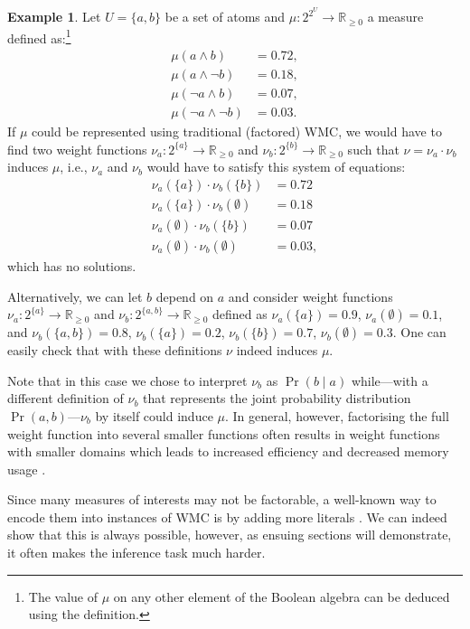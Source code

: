 \documentclass[letterpaper]{article} %
\theoremstyle{definition}
\newtheorem{example}{Example}
\theoremstyle{remark}
\begin{document}
{\begin{example}
  Let $U = \{a, b\}$ be a set of atoms and $\mu\colon 2^{2^U} \to
  \mathbb{R}_{\ge 0}$ a measure defined as:\footnote{The value of $\mu$ on any
    other element of the Boolean algebra can be deduced using the definition.}
  \begin{align*}
    \mu(a \land b) &= 0.72, \\
    \mu(a \land \neg b) &= 0.18, \\
    \mu(\neg a \land b) &= 0.07, \\
    \mu(\neg a \land \neg b) &= 0.03.
  \end{align*}
  If $\mu$ could be represented using traditional (factored) WMC, we would have
  to find two weight functions $\nu_a\colon 2^{\{a\}} \to \mathbb{R}_{\ge 0}$
  and $\nu_b\colon 2^{\{b\}} \to \mathbb{R}_{\ge 0}$ such that $\nu = \nu_a
  \cdot \nu_b$ induces $\mu$, i.e., $\nu_a$ and $\nu_b$ would have to satisfy
  this system of equations:
  \begin{align*}
    \nu_a(\{a\}) \cdot \nu_b(\{b\}) &= 0.72 \\
    \nu_a(\{a\}) \cdot \nu_b(\emptyset) &= 0.18 \\
    \nu_a(\emptyset) \cdot \nu_b(\{b\}) &= 0.07 \\
    \nu_a(\emptyset) \cdot \nu_b(\emptyset) &= 0.03,
  \end{align*}
  which has no solutions.

  Alternatively, we can let $b$ depend on $a$ and consider weight functions
  $\nu_a\colon 2^{\{a\}} \to \mathbb{R}_{\ge 0}$ and $\nu_b\colon 2^{\{a, b\}}
  \to \mathbb{R}_{\ge 0}$ defined as $\nu_a(\{a\}) = 0.9$, $\nu_a(\emptyset) =
  0.1$, and $\nu_b(\{a, b\}) = 0.8$, $\nu_b(\{a\}) = 0.2$, $\nu_b(\{b\}) = 0.7$,
  $\nu_b(\emptyset) = 0.3$. One can easily check that with these definitions
  $\nu$ indeed induces $\mu$.
\end{example}

Note that in this case we chose to interpret $\nu_b$ as $\Pr(b \mid a)$
while---with a different definition of $\nu_b$ that represents the joint
probability distribution $\Pr(a, b)$---$\nu_b$ by itself could induce $\mu$. In
general, however, factorising the full weight function into several smaller
functions often results in weight functions with smaller domains which leads to
increased efficiency and decreased memory usage \cite{DBLP:conf/aaai/DudekPV20}.

Since many measures of interests may not be factorable, a well-known way to
encode them into instances of WMC is by adding more literals
\cite{DBLP:journals/ai/ChaviraD08}. We can indeed show that this is always
possible, however, as ensuing sections will demonstrate, it often makes the
inference task much harder.

}
\end{document}

